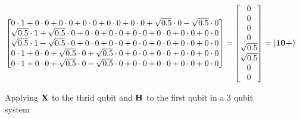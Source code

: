 \begin{figure}[H]
\begin{align*}
\begin{bmatrix}
            0           \cdot 1 +  0          \cdot 0 +   0          \cdot 0 +   0          \cdot 0 +   0               \cdot 0 +          0          \cdot 0 +   \sqrt{0.5} \cdot 0    -\sqrt{0.5}\cdot 0\\
            \sqrt{0.5}  \cdot 1 +  \sqrt{0.5} \cdot 0 +   0          \cdot 0 +   0          \cdot 0 +   0               \cdot 0 +          0          \cdot 0 +   0          \cdot 0 +   0         \cdot 0\\
            \sqrt{0.5}  \cdot 1   -\sqrt{0.5} \cdot 0 +   0          \cdot 0 +   0          \cdot 0 +   0               \cdot 0 +          0          \cdot 0 +   0          \cdot 0 +   0         \cdot 0\\
            0           \cdot 1 +  0          \cdot 0 +   \sqrt{0.5} \cdot 0 +   \sqrt{0.5} \cdot 0 +   0               \cdot 0 +          0          \cdot 0 +   0          \cdot 0 +   0         \cdot 0\\
            0           \cdot 1 +  0          \cdot 0 +   \sqrt{0.5} \cdot 0    -\sqrt{0.5} \cdot 0 +   0               \cdot 0 +          0          \cdot 0 +   0          \cdot 0 +   0         \cdot 0\\
        \end{bmatrix}
        =
        \begin{bmatrix}
            0\\
            0\\
            0\\
            0\\
            \sqrt{0.5}\\
            \sqrt{0.5}\\
            0\\
            0
        \end{bmatrix}
        &=
        \ket{\mathbf{1}\mathbf{0}\textbf{+}}
    \end{align*}
    \caption{Applying $\mathbf{X}$ to the thrid qubit and $\mathbf{H}$ to the first qubit in a 3 qubit system}
    \label{fig:app_applying_multiple_gates}
\end{figure}

